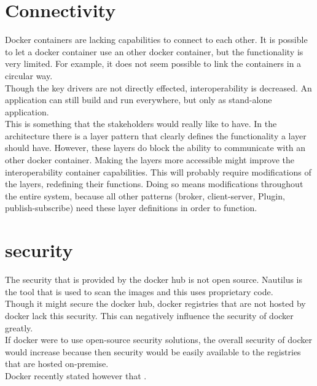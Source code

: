 \section{Connectivity}
\begin{itemize}
Docker containers are lacking capabilities to connect to each other. It is possible to let a docker container use an other docker container, but the functionality is very limited. For example, it does not seem possible to link the containers in a circular way.\\
Though the key drivers are not directly effected, interoperability is decreased. An application can still build and run everywhere, but only as stand-alone application.\\
This is something that the stakeholders would really like to have. In the architecture there is a layer pattern that clearly defines the functionality a layer should have. However, these layers do block the ability to communicate with an other docker container. Making the layers more accessible might improve the interoperability container capabilities. This will probably require modifications of the layers, redefining their functions. Doing so means modifications throughout the entire system, because all other patterns (broker, client-server, Plugin, publish-subscribe) need these layer definitions in order to function.
%
%


\section{security}
The security that is provided by the docker hub is not open source. Nautilus is the tool that is used to scan the images and this uses proprietary code.\\ 
Though it might secure the docker hub, docker registries that are not hosted by docker lack this security. This can negatively influence the security of docker greatly.\\
If docker were to use open-source security solutions, the overall security of docker would increase because then security would be easily available to the registries that are hosted on-premise.\\
Docker recently stated however that .



\end{itemize}
